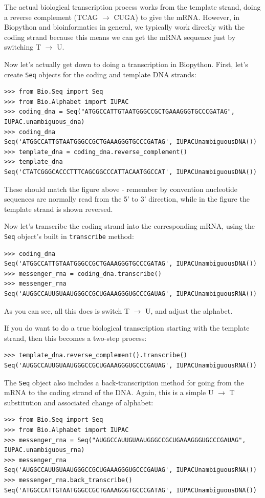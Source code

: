 \documentclass{report}
\begin{document}
The actual biological transcription process works from the template strand, doing a reverse complement (TCAG $\rightarrow$ CUGA) to give the mRNA.  However, in Biopython and bioinformatics in general, we typically work directly with the coding strand because this means we can get the mRNA sequence just by switching T $\rightarrow$ U.

Now let's actually get down to doing a transcription in Biopython.  First, let's create \verb|Seq| objects for the coding and template DNA strands:
\begin{verbatim}
>>> from Bio.Seq import Seq
>>> from Bio.Alphabet import IUPAC
>>> coding_dna = Seq("ATGGCCATTGTAATGGGCCGCTGAAAGGGTGCCCGATAG", IUPAC.unambiguous_dna)
>>> coding_dna
Seq('ATGGCCATTGTAATGGGCCGCTGAAAGGGTGCCCGATAG', IUPACUnambiguousDNA())
>>> template_dna = coding_dna.reverse_complement()
>>> template_dna
Seq('CTATCGGGCACCCTTTCAGCGGCCCATTACAATGGCCAT', IUPACUnambiguousDNA())
\end{verbatim}
\noindent These should match the figure above - remember by convention nucleotide sequences are normally read from the 5' to 3' direction, while in the figure the template strand is shown reversed.

Now let's transcribe the coding strand into the corresponding mRNA, using the \verb|Seq| object's built in \verb|transcribe| method:
\begin{verbatim}
>>> coding_dna
Seq('ATGGCCATTGTAATGGGCCGCTGAAAGGGTGCCCGATAG', IUPACUnambiguousDNA())
>>> messenger_rna = coding_dna.transcribe()
>>> messenger_rna
Seq('AUGGCCAUUGUAAUGGGCCGCUGAAAGGGUGCCCGAUAG', IUPACUnambiguousRNA())
\end{verbatim}
\noindent As you can see, all this does is switch T $\rightarrow$ U, and adjust the alphabet.

If you do want to do a true biological transcription starting with the template strand, then this becomes a two-step process:
\begin{verbatim}
>>> template_dna.reverse_complement().transcribe()
Seq('AUGGCCAUUGUAAUGGGCCGCUGAAAGGGUGCCCGAUAG', IUPACUnambiguousRNA())
\end{verbatim}

The \verb|Seq| object also includes a back-transcription method for going from the mRNA to the coding strand of the DNA.  Again, this is a simple U $\rightarrow$ T substitution and associated change of alphabet:
\begin{verbatim}
>>> from Bio.Seq import Seq
>>> from Bio.Alphabet import IUPAC
>>> messenger_rna = Seq("AUGGCCAUUGUAAUGGGCCGCUGAAAGGGUGCCCGAUAG", IUPAC.unambiguous_rna)
>>> messenger_rna
Seq('AUGGCCAUUGUAAUGGGCCGCUGAAAGGGUGCCCGAUAG', IUPACUnambiguousRNA())
>>> messenger_rna.back_transcribe()
Seq('ATGGCCATTGTAATGGGCCGCTGAAAGGGTGCCCGATAG', IUPACUnambiguousDNA())
\end{verbatim}
\end{document}
